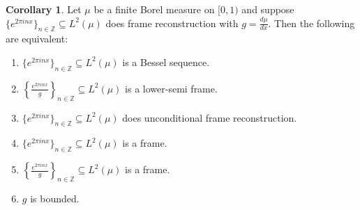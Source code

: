 \documentclass[11pt]{amsart}
\theoremstyle{definition}
\newtheorem{cor}{Corollary}[section]
\numberwithin{equation}{section}
\begin{document}
\begin{cor}
Let $\mu$ be a finite Borel measure on $[0,1)$ and suppose $\{ e^{2 \pi i n x} \}_{n \in \mathbb{Z}} \subseteq L^2(\mu)$ does frame reconstruction with $g=\frac{d\mu}{dx}$. Then the following are equivalent:
\begin{enumerate}
    \item $\{ e^{2 \pi i n x} \}_{n \in \mathbb{Z}} \subseteq L^2(\mu)$ is a Bessel sequence.
    \item $\left\{\frac{e^{2\pi i nx}}{g} \right\}_{n\in \mathbb{Z}}\subseteq L^2(\mu)$ is a lower-semi frame.
    \item $\{ e^{2 \pi i n x} \}_{n \in \mathbb{Z}} \subseteq L^2(\mu)$ does unconditional frame reconstruction.
    \item $\{ e^{2 \pi i n x} \}_{n \in \mathbb{Z}} \subseteq L^2(\mu)$ is a frame.
    \item $\left\{\frac{e^{2\pi i nx}}{g} \right\}_{n\in \mathbb{Z}}\subseteq L^2(\mu)$ is a frame.
    \item $g$ is bounded.
\end{enumerate}
\end{cor}
\end{document}
